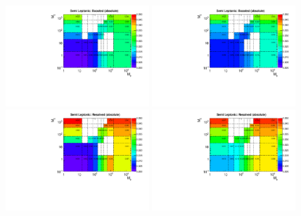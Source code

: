 \begin{figure}[htbp]
  \centering
  \includegraphics[width=0.48\textwidth]{figures/ttDM_S_semilep_2D_R08_boosted.pdf}
  \includegraphics[width=0.48\textwidth]{figures/ttDM_PS_semilep_2D_R08_boosted.pdf} \\
  \includegraphics[width=0.48\textwidth]{figures/ttDM_S_semilep_2D_R08_resolved.pdf}
  \includegraphics[width=0.48\textwidth]{figures/ttDM_PS_semilep_2D_R08_resolved.pdf}
  \caption{}
  \label{fig:semilept_acc08}
\end{figure}

